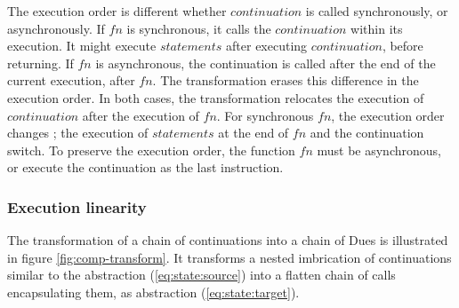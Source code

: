 \begin{figure}[h!]
\end{figure}

The execution order is different whether $continuation$ is called synchronously, or asynchronously.
If $fn$ is synchronous, it calls the $continuation$ within its execution.
It might execute $statements$ after executing $continuation$, before returning.
If $fn$ is asynchronous, the continuation is called after the end of the current execution, after $fn$.
The transformation erases this difference in the execution order.
In both cases, the transformation relocates the execution of $continuation$ after the execution of $fn$.
For synchronous $fn$, the execution order changes ; the execution of $statements$ at the end of $fn$ and the continuation switch.
To preserve the execution order, the function $fn$ must be asynchronous, or execute the continuation as the last instruction.


\subsubsection{Execution linearity}

The transformation of a chain of continuations into a chain of Dues is illustrated in figure \ref{fig:comp-transform}.
It transforms a nested imbrication of continuations similar to the abstraction (\ref{eq:state:source}) into a flatten chain of calls encapsulating them, as abstraction (\ref{eq:state:target}).

